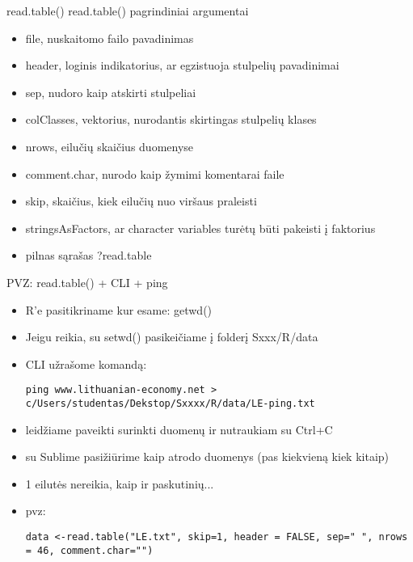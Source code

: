 \documentclass[11pt,xcolor=table]{beamer}
\begin{document}

\begin{frame}[fragile]{read.table()}
read.table() pagrindiniai argumentai
\begin{itemize}
\item file, nuskaitomo failo pavadinimas
\item header, loginis indikatorius, ar egzistuoja stulpelių pavadinimai
\item sep, nudoro kaip atskirti stulpeliai
\item colClasses, vektorius, nurodantis skirtingas stulpelių klases
\item nrows, eilučių skaičius duomenyse
\item comment.char, nurodo kaip žymimi komentarai faile
\item skip, skaičius, kiek eilučių nuo viršaus praleisti
\item stringsAsFactors, ar character variables turėtų būti pakeisti į faktorius
\item pilnas sąrašas ?read.table
\end{itemize}
\end{frame}


\begin{frame}[fragile]{PVZ: read.table() + CLI + ping}

\begin{itemize}
\item R'e pasitikriname kur esame: getwd()
\item Jeigu reikia, su setwd() pasikeičiame į folderį Sxxx/R/data
\item CLI užrašome komandą: 
\begin{lstlisting}
ping www.lithuanian-economy.net > c/Users/studentas/Dekstop/Sxxxx/R/data/LE-ping.txt
\end{lstlisting}
\item leidžiame paveikti surinkti duomenų ir nutraukiam su Ctrl+C
\item su Sublime pasižiūrime kaip atrodo duomenys (pas kiekvieną kiek kitaip)
\item 1 eilutės nereikia, kaip ir paskutinių...
\item pvz: 
\begin{lstlisting}
data <-read.table("LE.txt", skip=1, header = FALSE, sep=" ", nrows = 46, comment.char="")
\end{lstlisting}
\end{itemize}
\end{frame}
\end{document}
